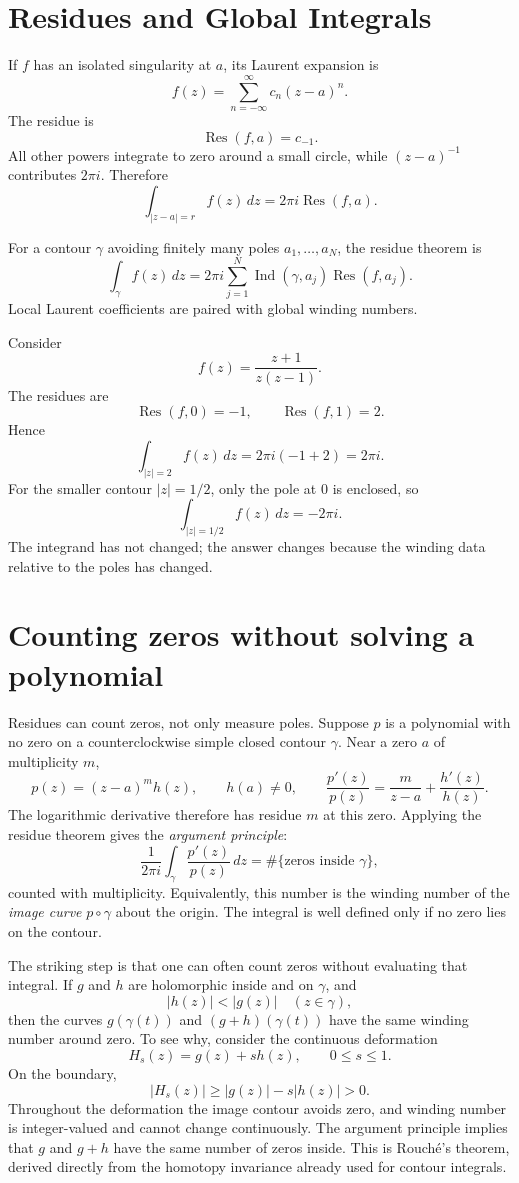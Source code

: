 \section{Residues and Global Integrals}

If \(f\) has an isolated singularity at \(a\), its Laurent expansion is
\[
  f(z)=\sum_{n=-\infty}^{\infty}c_n(z-a)^n.
\]
The residue is
\[
  \operatorname{Res}(f,a)=c_{-1}.
\]
All other powers integrate to zero around a small circle, while \((z-a)^{-1}\) contributes \(2\pi i\).  Therefore
\[
  \int_{|z-a|=r}f(z)\,dz
  =2\pi i\operatorname{Res}(f,a).
\]

For a contour \(\gamma\) avoiding finitely many poles \(a_1,\ldots,a_N\), the residue theorem is
\[
  \boxed{
  \int_\gamma f(z)\,dz
  =2\pi i
  \sum_{j=1}^N
  \operatorname{Ind}(\gamma,a_j)
  \operatorname{Res}(f,a_j).}
\]
Local Laurent coefficients are paired with global winding numbers.

Consider
\[
  f(z)=\frac{z+1}{z(z-1)}.
\]
The residues are
\[
  \operatorname{Res}(f,0)=-1,
  \qquad
  \operatorname{Res}(f,1)=2.
\]
Hence
\[
  \int_{|z|=2}f(z)\,dz
  =2\pi i(-1+2)=2\pi i.
\]
For the smaller contour \(|z|=1/2\), only the pole at \(0\) is enclosed, so
\[
  \int_{|z|=1/2}f(z)\,dz=-2\pi i.
\]
The integrand has not changed; the answer changes because the winding data relative to the poles has changed.

\section{Counting zeros without solving a polynomial}

Residues can count zeros, not only measure poles. Suppose $p$ is a polynomial with no zero on a counterclockwise simple closed contour $\gamma$. Near a zero $a$ of multiplicity $m$,
\[
 p(z)=(z-a)^m h(z),\qquad h(a)\ne0,
 \qquad
 \frac{p'(z)}{p(z)}=\frac{m}{z-a}+\frac{h'(z)}{h(z)}.
\]
The logarithmic derivative therefore has residue $m$ at this zero. Applying the residue theorem gives the \emph{argument principle}:
\[
 \boxed{\frac1{2\pi i}\int_\gamma\frac{p'(z)}{p(z)}\,dz
 =\#\{\text{zeros inside }\gamma\},}
\]
counted with multiplicity. Equivalently, this number is the winding number of the \emph{image curve} $p\circ\gamma$ about the origin. The integral is well defined only if no zero lies on the contour.

The striking step is that one can often count zeros without evaluating that integral. If $g$ and $h$ are holomorphic inside and on $\gamma$, and
\[
 \boxed{|h(z)|<|g(z)|\quad(z\in\gamma),}
\]
then the curves $g(\gamma(t))$ and $(g+h)(\gamma(t))$ have the same winding number around zero. To see why, consider the continuous deformation
\[
 H_s(z)=g(z)+s h(z),\qquad 0\le s\le1.
\]
On the boundary,
\[
 |H_s(z)|\ge|g(z)|-s|h(z)|>0.
\]
Throughout the deformation the image contour avoids zero, and winding number is integer-valued and cannot change continuously. The argument principle implies that $g$ and $g+h$ have the same number of zeros inside. This is Rouch\'e's theorem, derived directly from the homotopy invariance already used for contour integrals.

